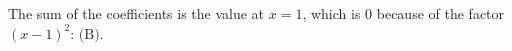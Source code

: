 The sum of the coefficients is the value at $x=1$, which is $0$ because of the factor $(x-1)^2$: $\boxed{\text{(B)}}$.
